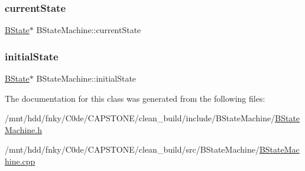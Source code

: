 \mbox{\label{classBStateMachine_a17df33dd6465b8305bd5ff3a0e23cd35}} 
\subsubsection{\texorpdfstring{current\+State}{currentState}}
{\footnotesize\ttfamily \hyperlink{classBState}{B\+State}$\ast$ B\+State\+Machine\+::current\+State\hspace{0.3cm}{\ttfamily [private]}}

\mbox{\label{classBStateMachine_a0119312b98d2eb47ff4bca56f91e1fc9}} 
\subsubsection{\texorpdfstring{initial\+State}{initialState}}
{\footnotesize\ttfamily \hyperlink{classBState}{B\+State}$\ast$ B\+State\+Machine\+::initial\+State\hspace{0.3cm}{\ttfamily [private]}}



The documentation for this class was generated from the following files\+:\begin{DoxyCompactItemize}
\item 
/mnt/hdd/fnky/\+C0de/\+C\+A\+P\+S\+T\+O\+N\+E/clean\+\_\+build/include/\+B\+State\+Machine/\hyperlink{BStateMachine_8h}{B\+State\+Machine.\+h}\item 
/mnt/hdd/fnky/\+C0de/\+C\+A\+P\+S\+T\+O\+N\+E/clean\+\_\+build/src/\+B\+State\+Machine/\hyperlink{BStateMachine_8cpp}{B\+State\+Machine.\+cpp}\end{DoxyCompactItemize}

